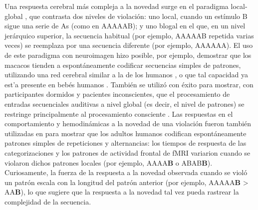 
Una respuesta cerebral más compleja a la novedad surge en el paradigma local-global \cite{f67,f68}, que contrasta dos niveles de violación: uno local, cuando un estímulo B sigue una serie de As (como en AAAAAB); y uno blogal en el que, en un nivel jerárquico superior, la secuencia habitual (por ejemplo, AAAAAB repetida varias veces) se reemplaza por una secuencia diferente (por ejemplo, AAAAAA). El uso de este paradigma con neuroimagen hizo posible, por ejemplo, demostrar que los macacos tienden a espontáneamente codificar secuencias simples de patrones, utilizando una red cerebral similar a la de los humanos \cite{f13,f66,f69}, o que tal capacidad ya est'a presente en bebés humanos \cite{f70}. También se utilizó con éxito para mostrar, con participantes dormidos y pacientes inconscientes, que el procesamiento de entradas secuenciales auditivas a nivel global (es decir, el nivel de patrones) se restringe principalmente al procesamiento consciente \cite{f67,f71,f72}. Las respuestas en el comportamiento y hemodinámicas a la novedad de una violación fueron también utilizadas en \cite{f19} para mostrar que los adultos humanos codifican espontáneamente patrones simples de repeticiones y alternancias: los tiempos de respuesta de las categorizaciones y los patrones de actividad frontal de fMRI variarion cuando se violaron dichos patrones locales (por ejemplo, AAAA\textbf{B} o ABAB\textbf{B}). Curiosamente, la fuerza de la respuesta a la novedad observada cuando se violó un patrón escala con la longitud del patrón anterior (por ejemplo, AAAAA\textbf{B} > AA\textbf{B}), lo que sugiere que la respuesta a la novedad tal vez pueda rastrear la complejidad de la secuencia.

